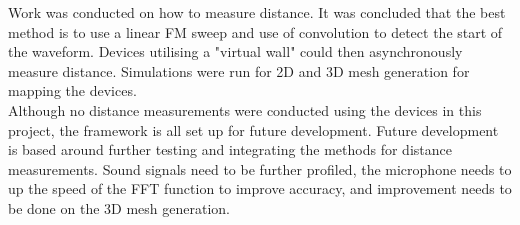 Work was conducted on how to measure distance. It was concluded that the best method is to use a linear FM sweep and use of convolution to detect the start of the waveform. Devices utilising a "virtual wall" could then asynchronously measure distance. Simulations were run for 2D and 3D mesh generation for mapping the devices. \\

Although no distance measurements were conducted using the devices in this project, the framework is all set up for future development. Future development is based around further testing and integrating the methods for distance measurements. Sound signals need to be further profiled, the microphone needs to up the speed of the FFT function to improve accuracy, and improvement needs to be done on the 3D mesh generation. \\